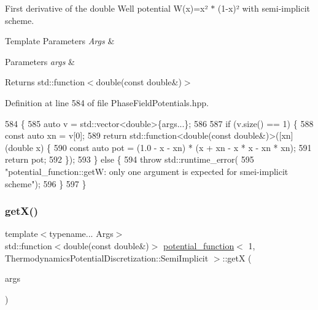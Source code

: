 First derivative of the double Well potential W(x)=x² $\ast$ (1-\/x)² with semi-\/implicit scheme. 


\begin{DoxyTemplParams}{Template Parameters}
{\em Args} & \\
\hline
\end{DoxyTemplParams}

\begin{DoxyParams}{Parameters}
{\em args} & \\
\hline
\end{DoxyParams}
\begin{DoxyReturn}{Returns}
std\+::function$<$double(const double\&)$>$ 
\end{DoxyReturn}


Definition at line 584 of file Phase\+Field\+Potentials.\+hpp.


\begin{DoxyCode}
584                                                         \{
585     \textcolor{keyword}{auto} v = std::vector<double>\{args...\};
586 
587     \textcolor{keywordflow}{if} (v.size() == 1) \{
588       \textcolor{keyword}{const} \textcolor{keyword}{auto} xn = v[0];
589       \textcolor{keywordflow}{return} std::function<double(const double&)>([xn](\textcolor{keywordtype}{double} x) \{
590         \textcolor{keyword}{const} \textcolor{keyword}{auto} pot = (1.0 - x - xn) * (x + xn - x * x - xn * xn);
591         \textcolor{keywordflow}{return} pot;
592       \});
593     \} \textcolor{keywordflow}{else} \{
594       \textcolor{keywordflow}{throw} std::runtime\_error(
595           \textcolor{stringliteral}{"potential\_function::getW: only one argument is expected for smei-implicit scheme"});
596     \}
597   \}
\end{DoxyCode}
\mbox{\label{structpotential__function_3_011_00_01ThermodynamicsPotentialDiscretization_1_1SemiImplicit_01_4_ad139574d08b145db4f8ed0274e0d388e}} 
\subsubsection{\texorpdfstring{get\+X()}{getX()}}
{\footnotesize\ttfamily template$<$typename... Args$>$ \\
std\+::function$<$double(const double\&)$>$ \hyperlink{structpotential__function}{potential\+\_\+function}$<$ 1, Thermodynamics\+Potential\+Discretization\+::\+Semi\+Implicit $>$\+::getX (\begin{DoxyParamCaption}\item[{Args...}]{args }\end{DoxyParamCaption})\hspace{0.3cm}{\ttfamily [inline]}}




